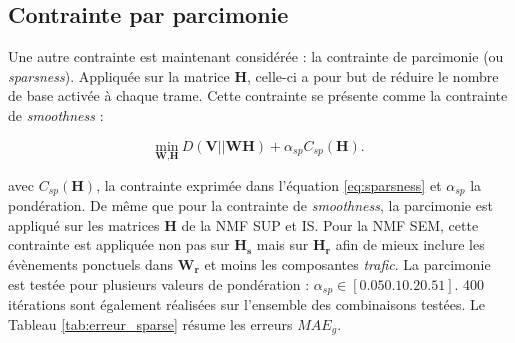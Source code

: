 \subsection{Contrainte par parcimonie}

Une autre contrainte est maintenant considérée : la contrainte de parcimonie (ou \textit{sparsness}). Appliquée sur la matrice $\mathbf{H}$, celle-ci a pour but de réduire le nombre de base activée à chaque trame. Cette contrainte se présente comme la contrainte de \textit{smoothness} : 

\begin{equation}
\underset{\textbf{W},\textbf{H}}{\text{min}}~D\left(\textbf{V} \vert\vert \textbf{WH}\right) + \alpha_{sp} C_{sp}(\mathbf{H}).
\end{equation}

avec $C_{sp}(\mathbf{H})$, la contrainte exprimée dans l'équation \ref{eq:sparsness} et $\alpha_{sp}$ la pondération. De même que pour la contrainte de \textit{smoothness}, la parcimonie est appliqué sur les matrices $\mathbf{H}$ de la NMF SUP et IS. Pour la NMF SEM, cette contrainte est appliquée non pas sur $\mathbf{H_s}$ mais sur $\mathbf{H_r}$ afin de mieux inclure les évènements ponctuels dans $\mathbf{W_r}$ et moins les composantes \textit{trafic}. La parcimonie est testée pour plusieurs valeurs de pondération : $\alpha_{sp} \in \left[0.05 0.1 0.2 0.5 1\right]$. 400 itérations sont également réalisées sur l'ensemble des combinaisons testées. Le Tableau \ref{tab:erreur_sparse} résume les erreurs $MAE_g$.

